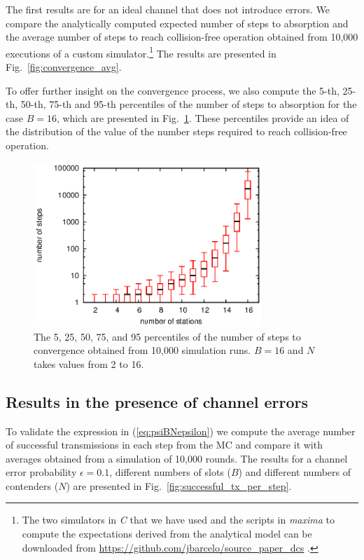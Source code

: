 \documentclass[journal]{IEEEtran}
\begin{document}
The first results are for an ideal channel that does not introduce errors.
We compare the analytically computed expected number of steps to absorption and the average number of steps to reach collision-free operation obtained from 10,000 executions of a custom simulator.\footnote{The two simulators in \emph{C} that we have used and the scripts in \emph{maxima} to compute the expectations derived from the analytical model can be downloaded from \url{https://github.com/jbarcelo/source_paper_dcs} .}
The results are presented in Fig.~\ref{fig:convergence_avg}.

To offer further insight on the convergence process, we also compute the 5-th, 25-th, 50-th, 75-th and 95-th percentiles of the number of steps to absorption for the case $B=16$, which are presented in Fig.~\ref{fig:convergence_stats}.
These percentiles provide an idea of the distribution of the value of the number steps required to reach collision-free operation.
\begin{figure}[h]
\centering
\includegraphics[height=6.2cm]{figures/convergence_stats}
\caption{The 5, 25, 50, 75, and 95 percentiles of the number of steps to convergence obtained from 10,000 simulation runs. $B=16$ and $N$ takes values from 2 to 16.}
\label{fig:convergence_stats}
\end{figure}


\subsection{Results in the presence of channel errors}
To validate the expression in (\ref{eq:psiBNepsilon}) we compute the average number of successful transmissions in each step from the MC and compare it with averages obtained from a simulation of 10,000 rounds.
The results for a channel error probability $\epsilon=0.1$, different numbers of slots ($B$) and different numbers of contenders ($N$) are presented in Fig.~\ref{fig:successful_tx_per_step}.
\end{document}
